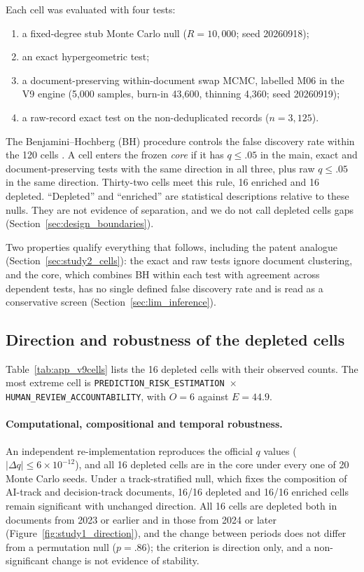 Each cell was evaluated with four tests:
\begin{enumerate}
  \item a fixed-degree stub Monte Carlo null ($R = 10{,}000$; seed 20260918);
  \item an exact hypergeometric test;
  \item a document-preserving within-document swap MCMC, labelled M06 in the V9 engine (5,000 samples, burn-in 43,600, thinning 4,360; seed 20260919);
  \item a raw-record exact test on the non-deduplicated records ($n = 3{,}125$).
\end{enumerate}
The Benjamini--Hochberg (BH) procedure controls the false discovery rate within the 120 cells \citep{benjamini1995controlling}. A cell enters the frozen \emph{core} if it has $q \le .05$ in the main, exact and document-preserving tests with the same direction in all three, plus raw $q \le .05$ in the same direction. Thirty-two cells meet this rule, 16 enriched and 16 depleted. ``Depleted'' and ``enriched'' are statistical descriptions relative to these nulls. They are not evidence of separation, and we do not call depleted cells gaps (Section~\ref{sec:design_boundaries}).

Two properties qualify everything that follows, including the patent analogue (Section~\ref{sec:study2_cells}): the exact and raw tests ignore document clustering, and the core, which combines BH within each test with agreement across dependent tests, has no single defined false discovery rate and is read as a conservative screen (Section~\ref{sec:lim_inference}).

\subsection{Direction and robustness of the depleted cells}
\label{sec:study1_direction}

Table~\ref{tab:app_v9cells} lists the 16 depleted cells with their observed counts. The most extreme cell is \texttt{PREDICTION\_\allowbreak RISK\_\allowbreak ESTIMATION}~$\times$ \texttt{HUMAN\_\allowbreak REVIEW\_\allowbreak ACCOUNTABILITY}, with $O = 6$ against $E = 44.9$.

\paragraph{Computational, compositional and temporal robustness.} An independent re-implementation reproduces the official $q$ values ($|\Delta q| \le 6\times10^{-12}$), and all 16 depleted cells are in the core under every one of 20 Monte Carlo seeds. Under a track-stratified null, which fixes the composition of AI-track and decision-track documents, 16/16 depleted and 16/16 enriched cells remain significant with unchanged direction. All 16 cells are depleted both in documents from 2023 or earlier and in those from 2024 or later (Figure~\ref{fig:study1_direction}), and the change between periods does not differ from a permutation null ($p = .86$); the criterion is direction only, and a non-significant change is not evidence of stability.

